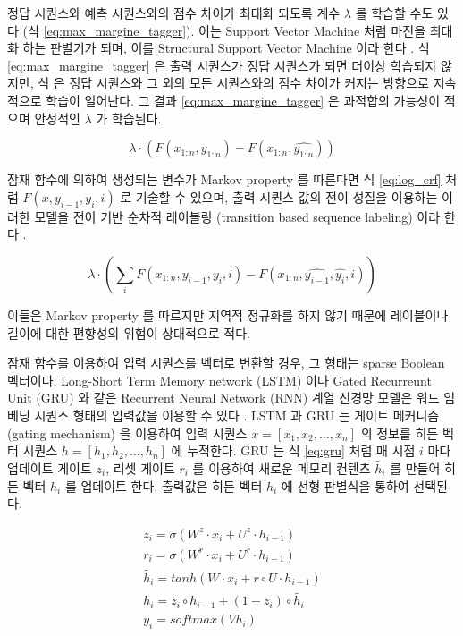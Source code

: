\documentclass[oneside, ko,phd]{snuthesis_utf8_kor}
\begin{document}
정답 시퀀스와 예측 시퀀스와의 점수 차이가 최대화 되도록 계수 $\lambda$ 를 학습할 수도 있다 (식 \ref{eq:max_margine_tagger}).
이는 Support Vector Machine 처럼 마진을 최대화 하는 판별기가 되며, 이를 Structural Support Vector Machine 이라 한다 \cite{taskar2004max, tsochantaridis2005large}.
식 \ref{eq:max_margine_tagger} 은 출력 시퀀스가 정답 시퀀스가 되면 더이상 학습되지 않지만, 식 \label{eq:crf} 은 정답 시퀀스와 그 외의 모든 시퀀스와의 점수 차이가 커지는 방향으로 지속적으로 학습이 일어난다.
그 결과 \ref{eq:max_margine_tagger} 은 과적합의 가능성이 적으며 안정적인 $\lambda$ 가 학습된다.

\begin{equation}
  \label{eq:max_margine_tagger}
  \lambda \cdot \left( F(x_{1:n}, y_{1:n}) - F(x_{1:n}, \hat{y_{1:n}}) \right)
\end{equation}

잠재 함수에 의하여 생성되는 변수가 Markov property 를 따른다면 식 \ref{eq:log_crf} 처럼 $F(x, y_{i-1}, y_{i}, i)$ 로 기술할 수 있으며, 출력 시퀀스 값의 전이 성질을 이용하는 이러한 모델을 전이 기반 순차적 레이블링 (transition based sequence labeling) 이라 한다 \cite{bohnet2012transition}.

\begin{equation}
  \label{eq:transition_based_tagger_i}
  \lambda \cdot \left( \sum_i F(x_{1:n}, y_{i-1}, y_i, i) - F(x_{1:n}, \hat{y_{i-1}}, \hat{y_i}, i) \right)
\end{equation}

이들은 Markov property 를 따르지만 지역적 정규화를 하지 않기 때문에 레이블이나 길이에 대한 편향성의 위험이 상대적으로 적다.

잠재 함수를 이용하여 입력 시퀀스를 벡터로 변환할 경우, 그 형태는 sparse Boolean 벡터이다.
Long-Short Term Memory network (LSTM) 이나 Gated Recurreunt Unit (GRU) 와 같은 Recurrent Neural Network (RNN) 계열 신경망 모델은 워드 임베딩 시퀀스 형태의 입력값을 이용할 수 있다 \cite{cho2014learning, hochreiter1997long}.
LSTM 과 GRU 는 게이트 메커니즘 (gating mechanism) 을 이용하여 입력 시퀀스 $x = [x_1, x_2, \dots, x_n]$ 의 정보를 히든 벡터 시퀀스 $h = [h_1, h_2, \dots, h_n]$ 에 누적한다.
GRU 는 식 \ref{eq:gru} 처럼 매 시점 $i$ 마다 업데이트 게이트 $z_i$, 리셋 게이트 $r_i$ 를 이용하여 새로운 메모리 컨텐츠 $\tilde{h_i}$ 를 만들어 히든 벡터 $h_i$ 를 업데이트 한다.
출력값은 히든 벡터 $h_i$ 에 선형 판별식을 통하여 선택된다.

\begin{equation}
  \label{eq:gru}
  \begin{aligned}
  z_i = \sigma(W^z \cdot x_i + U^z \cdot h_{i-1}) \\
  r_i = \sigma(W^r \cdot x_i + U^r \cdot h_{i-1}) \\
  \tilde{h_i} = tanh \left( W \cdot x_i + r \circ U \cdot h_{i-1}\right) \\
  h_i = z_i \circ h_{i-1} + (1 - z_i) \circ \tilde{h_i} \\
  y_i = softmax(Vh_i)
  \end{aligned}
\end{equation}
\end{document}
